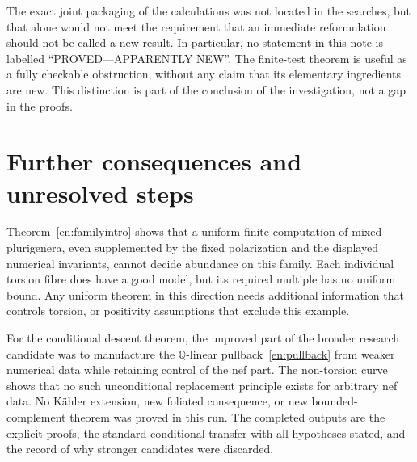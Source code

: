 \documentclass[12pt]{amsart}
\theoremstyle{definition}
\theoremstyle{remark}
\numberwithin{equation}{section}
\newcommand{\Q}{\mathbb{Q}}
\begin{document}
The exact joint packaging of the calculations was not located in the searches, but that alone would not meet the requirement that an immediate reformulation should not be called a new result. In particular, no statement in this note is labelled ``PROVED---APPARENTLY NEW''. The finite-test theorem is useful as a fully checkable obstruction, without any claim that its elementary ingredients are new. This distinction is part of the conclusion of the investigation, not a gap in the proofs.

\section{Further consequences and unresolved steps}\label{en:further}
Theorem~\ref{en:familyintro} shows that a uniform finite computation of mixed plurigenera, even supplemented by the fixed polarization and the displayed numerical invariants, cannot decide abundance on this family. Each individual torsion fibre does have a good model, but its required multiple has no uniform bound. Any uniform theorem in this direction needs additional information that controls torsion, or positivity assumptions that exclude this example.

For the conditional descent theorem, the unproved part of the broader research candidate was to manufacture the $\Q$-linear pullback~\eqref{en:pullback} from weaker numerical data while retaining control of the nef part. The non-torsion curve shows that no such unconditional replacement principle exists for arbitrary nef data. No K\"ahler extension, new foliated consequence, or new bounded-complement theorem was proved in this run. The completed outputs are the explicit proofs, the standard conditional transfer with all hypotheses stated, and the record of why stronger candidates were discarded.
\end{document}
